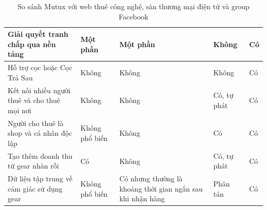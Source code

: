 \begin{table}[H]
\begin{tabular}{|p{4.4cm}|p{2.8cm}|p{2.8cm}|p{2.8cm}|p{2.2cm}|}
        Giải quyết tranh chấp qua nền tảng & Một phần & Một phần & Không & Có \\
        \hline
        Hỗ trợ cọc hoặc Cọc Trả Sau & Không & Không & Không & Có \\
        \hline
        Kết nối nhiều người thuê và cho thuê mọi nơi & Không & Không & Có, tự phát & Có \\
        \hline
        Người cho thuê là shop và cá nhân độc lập & Không phổ biến & Không & Có & Có \\
        \hline
        Tạo thêm doanh thu từ gear nhàn rỗi & Có & Không & Có, tự phát & Có \\
        \hline
        Dữ liệu tập trung về cảm giác sử dụng gear & Không phổ biến & Có nhưng thường là khoảng thời gian ngắn sau khi nhận hàng & Phân tán & Có \\
        \hline
    \end{tabular}
    \renewcommand{\arraystretch}{1}
    \caption{So sánh Mutux với web thuê công nghệ, sàn thương mại điện tử và group Facebook}
\end{table}